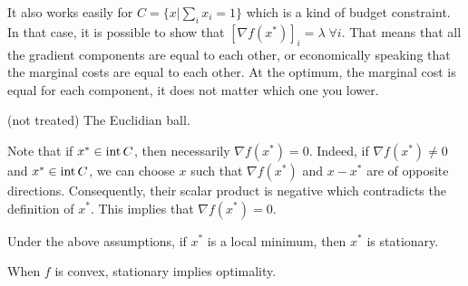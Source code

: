\begin{example}
\begin{leftbar}
It also works easily for $C = \{x|\sum_{i}x_i=1\}$ which is a kind of budget constraint. In that case, it is possible to show that $[\nabla f(x^*)]_i = \lambda \; \forall i$. That means that all the gradient components are equal to each other, or economically speaking that the marginal costs are equal to each other. At the optimum, the marginal cost is equal for each component, it does not matter which one you lower.
\end{leftbar}
\end{example}

\begin{example}
\begin{leftbar}
(not treated) The Euclidian ball.
\end{leftbar}
\end{example}


Note that if $x^* \in \mathrm{int}\, C$, then necessarily $\nabla f(x^*) = 0$.
Indeed, if $\nabla f(x^*) \neq 0$ and $x^* \in \mathrm{int}\, C$, we can choose $x$ such that $\nabla f(x^*)$ and $x-x^*$ are of opposite directions. Consequently, their scalar product is negative which contradicts the definition of $x^*$. This implies that $\nabla f(x^*) = 0$.

\begin{theorem}
Under the above assumptions, if $x^*$ is a local minimum, then $x^*$ is stationary.
\end{theorem}

\begin{theorem}
When $f$ is convex, stationary implies optimality.
\end{theorem}


